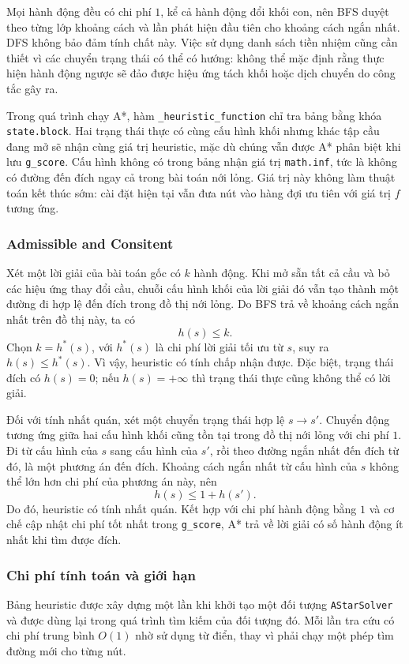 Mọi hành động đều có chi phí $1$, kể cả hành động đổi khối con, nên
BFS duyệt theo từng lớp khoảng cách và lần phát hiện đầu tiên cho
khoảng cách ngắn nhất. DFS không bảo đảm tính chất này. Việc sử dụng
danh sách tiền nhiệm cũng cần thiết vì các chuyển trạng thái có thể
có hướng: không thể mặc định rằng thực hiện hành động ngược sẽ đảo
được hiệu ứng tách khối hoặc dịch chuyển do công tắc gây ra.

Trong quá trình chạy A*, hàm \texttt{\_heuristic\_function} chỉ tra
bảng bằng khóa \texttt{state.block}. Hai trạng thái thực có cùng cấu
hình khối nhưng khác tập cầu đang mở sẽ nhận cùng giá trị heuristic,
mặc dù chúng vẫn được A* phân biệt khi lưu \texttt{g\_score}. Cấu hình
không có trong bảng nhận giá trị \texttt{math.inf}, tức là không có
đường đến đích ngay cả trong bài toán nới lỏng. Giá trị này không làm
thuật toán kết thúc sớm: cài đặt hiện tại vẫn đưa nút vào hàng đợi
ưu tiên với giá trị $f$ tương ứng.

\subsubsection{Admissible and Consitent}
Xét một lời giải của bài toán gốc có $k$ hành động. Khi mở sẵn tất cả
cầu và bỏ các hiệu ứng thay đổi cầu, chuỗi cấu hình khối của lời giải
đó vẫn tạo thành một đường đi hợp lệ đến đích trong đồ thị nới lỏng.
Do BFS trả về khoảng cách ngắn nhất trên đồ thị này, ta có
\[
    h(s) \leq k.
\]
Chọn $k = h^*(s)$, với $h^*(s)$ là chi phí lời giải tối ưu từ $s$,
suy ra $h(s) \leq h^*(s)$. Vì vậy, heuristic có tính chấp nhận được.
Đặc biệt, trạng thái đích có $h(s)=0$; nếu $h(s)=+\infty$ thì trạng
thái thực cũng không thể có lời giải.

Đối với tính nhất quán, xét một chuyển trạng thái hợp lệ $s \to s'$.
Chuyển động tương ứng giữa hai cấu hình khối cũng tồn tại trong đồ
thị nới lỏng với chi phí $1$. Đi từ cấu hình của $s$ sang cấu hình
của $s'$, rồi theo đường ngắn nhất đến đích từ đó, là một phương án
đến đích. Khoảng cách ngắn nhất từ cấu hình của $s$ không thể lớn hơn
chi phí của phương án này, nên
\[
    h(s) \leq 1 + h(s').
\]
Do đó, heuristic có tính nhất quán. Kết hợp với chi phí hành động
bằng $1$ và cơ chế cập nhật chi phí tốt nhất trong \texttt{g\_score},
A* trả về lời giải có số hành động ít nhất khi tìm được đích.

\subsubsection{Chi phí tính toán và giới hạn}
Bảng heuristic được xây dựng một lần khi khởi tạo một đối tượng
\texttt{AStarSolver} và được dùng lại trong quá trình tìm kiếm của
đối tượng đó. Mỗi lần tra cứu có chi phí trung bình $O(1)$ nhờ sử
dụng từ điển, thay vì phải chạy một phép tìm đường mới cho từng nút.

